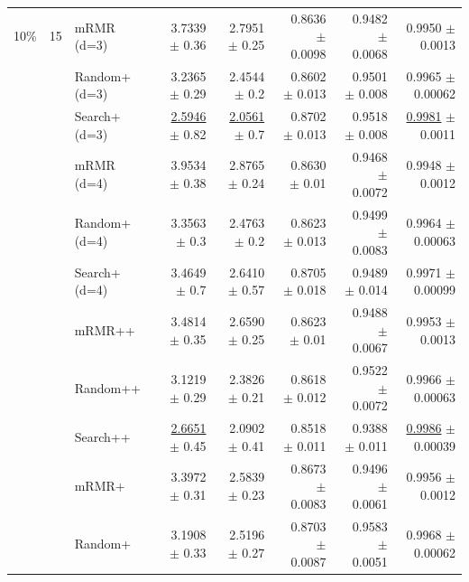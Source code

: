 \begin{longtable}{llp{}rrrrr}
\midrule
10\% & 15 & mRMR (d=3) & 3.7339 {\scriptsize $\pm$ 0.36} & 2.7951 {\scriptsize $\pm$ 0.25} & 0.8636 {\scriptsize $\pm$ 0.0098} & 0.9482 {\scriptsize $\pm$ 0.0068} & 0.9950 {\scriptsize $\pm$ 0.0013} \\
 &  & Random+ (d=3) & 3.2365 {\scriptsize $\pm$ 0.29} & 2.4544 {\scriptsize $\pm$ 0.2} & 0.8602 {\scriptsize $\pm$ 0.013} & 0.9501 {\scriptsize $\pm$ 0.008} & 0.9965 {\scriptsize $\pm$ 0.00062} \\
 &  & Search+ (d=3) & \underline{2.5946} {\scriptsize $\pm$ 0.82} & \underline{2.0561} {\scriptsize $\pm$ 0.7} & 0.8702 {\scriptsize $\pm$ 0.013} & 0.9518 {\scriptsize $\pm$ 0.008} & \underline{0.9981} {\scriptsize $\pm$ 0.0011} \\
 &  & mRMR (d=4) & 3.9534 {\scriptsize $\pm$ 0.38} & 2.8765 {\scriptsize $\pm$ 0.24} & 0.8630 {\scriptsize $\pm$ 0.01} & 0.9468 {\scriptsize $\pm$ 0.0072} & 0.9948 {\scriptsize $\pm$ 0.0012} \\
 &  & Random+ (d=4) & 3.3563 {\scriptsize $\pm$ 0.3} & 2.4763 {\scriptsize $\pm$ 0.2} & 0.8623 {\scriptsize $\pm$ 0.013} & 0.9499 {\scriptsize $\pm$ 0.0083} & 0.9964 {\scriptsize $\pm$ 0.00063} \\
 &  & Search+ (d=4) & 3.4649 {\scriptsize $\pm$ 0.7} & 2.6410 {\scriptsize $\pm$ 0.57} & 0.8705 {\scriptsize $\pm$ 0.018} & 0.9489 {\scriptsize $\pm$ 0.014} & 0.9971 {\scriptsize $\pm$ 0.00099} \\
 &  & mRMR++ & 3.4814 {\scriptsize $\pm$ 0.35} & 2.6590 {\scriptsize $\pm$ 0.25} & 0.8623 {\scriptsize $\pm$ 0.01} & 0.9488 {\scriptsize $\pm$ 0.0067} & 0.9953 {\scriptsize $\pm$ 0.0013} \\
 &  & Random++ & 3.1219 {\scriptsize $\pm$ 0.29} & 2.3826 {\scriptsize $\pm$ 0.21} & 0.8618 {\scriptsize $\pm$ 0.012} & 0.9522 {\scriptsize $\pm$ 0.0072} & 0.9966 {\scriptsize $\pm$ 0.00063} \\
 &  & Search++ & \underline{2.6651} {\scriptsize $\pm$ 0.45} & 2.0902 {\scriptsize $\pm$ 0.41} & 0.8518 {\scriptsize $\pm$ 0.011} & 0.9388 {\scriptsize $\pm$ 0.011} & \underline{0.9986} {\scriptsize $\pm$ 0.00039} \\
 &  & mRMR+ & 3.3972 {\scriptsize $\pm$ 0.31} & 2.5839 {\scriptsize $\pm$ 0.23} & 0.8673 {\scriptsize $\pm$ 0.0083} & 0.9496 {\scriptsize $\pm$ 0.0061} & 0.9956 {\scriptsize $\pm$ 0.0012} \\
 &  & Random+ & 3.1908 {\scriptsize $\pm$ 0.33} & 2.5196 {\scriptsize $\pm$ 0.27} & 0.8703 {\scriptsize $\pm$ 0.0087} & 0.9583 {\scriptsize $\pm$ 0.0051} & 0.9968 {\scriptsize $\pm$ 0.00062} \\

\end{longtable}

